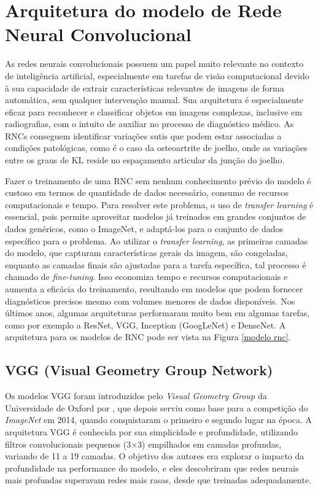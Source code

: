 \section{Arquitetura do modelo de Rede Neural Convolucional}

As redes neurais convolucionais possuem um papel muito relevante no contexto de inteligência artificial, especialmente em tarefas de visão computacional devido à sua capacidade de extrair características relevantes de imagens de forma automática, sem qualquer intervenção manual. Sua arquitetura é especialmente eficaz para reconhecer e classificar objetos em imagens complexas, inclusive em radiografias, com o intuito de auxiliar no processo de diagnóstico médico. As RNCs conseguem identificar variações sutis que podem estar associadas a condições patológicas, como é o caso da osteoartrite de joelho, onde as variações entre os graus de KL reside no espaçamento articular da junção do joelho.

Fazer o treinamento de uma RNC sem nenhum conhecimento prévio do modelo é custoso em termos de quantidade de dados necessário, consumo de recursos computacionais e tempo. Para resolver este problema, o uso de \textit{transfer learning} é essencial, pois permite aproveitar modelos já treinados em grandes conjuntos de dados genéricos, como o ImageNet, e adaptá-los para o conjunto de dados específico para o problema. Ao utilizar o \textit{transfer learning}, as primeiras camadas do modelo, que capturam características gerais da imagem, são congeladas, enquanto as camadas finais são ajustadas para a tarefa específica, tal processo é chamado de \textit{fine-tuning}. Isso economiza tempo e recursos computacionais e aumenta a eficácia do treinamento, resultando em modelos que podem fornecer diagnósticos precisos mesmo com volumes menores de dados disponíveis. Nos últimos anos, algumas arquiteturas performaram muito bem em algumas tarefas, como por exemplo a ResNet, VGG, Inception (GoogLeNet) e DenseNet. A arquitetura para os modelos de RNC pode ser vista na Figura \ref{modelo rnc}.

\subsection{VGG (Visual Geometry Group Network)}

Os modelos VGG foram introduzidos pelo \textit{Visual Geometry Group} da Universidade de Oxford por \cite{Simonyan2015}, que depois serviu como base para a competição do \textit{ImageNet} em 2014, quando conquistaram o primeiro e segundo lugar na época. A arquitetura VGG é conhecida por sua simplicidade e profundidade, utilizando filtros convolucionais pequenos (3×3) empilhados em camadas profundas, variando de 11 a 19 camadas. O objetivo dos autores era explorar o impacto da profundidade na performance do modelo, e eles descobriram que redes neurais mais profundas superavam redes mais rasas, desde que treinadas adequadamente.

